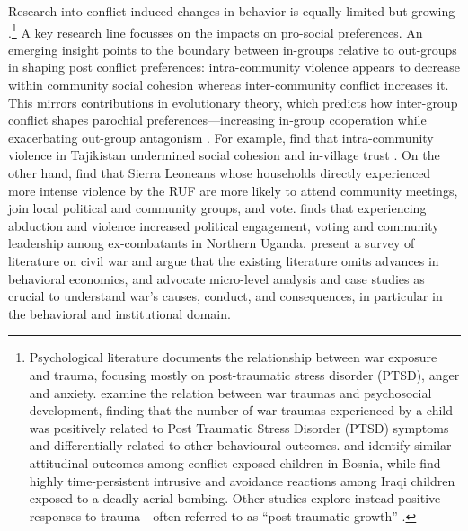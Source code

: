 Research into conflict induced changes in behavior is equally limited but growing \citep{Blattman2010b}.\footnote{Psychological literature documents the relationship between war exposure and trauma, focusing mostly on post-traumatic stress disorder (PTSD), anger and anxiety. \citet{Macksoud1996a} examine the relation between war traumas and psychosocial development, finding that the number of war traumas experienced by a child was positively related to Post Traumatic Stress Disorder (PTSD) symptoms and differentially related to other behavioural outcomes. \citet{Smith2002} and \citet{Layne2010} identify similar attitudinal outcomes among conflict exposed children in Bosnia, while \citet{Dyregrov2002} find highly time-persistent intrusive and avoidance reactions among Iraqi children exposed to a deadly aerial bombing. Other studies explore instead positive responses to trauma––often referred to as ``post-traumatic growth'' \citep{Tedeschi1996,Powell2003,Staub2008,Vollhardt2009}.} A key research line focusses on the impacts on pro-social preferences. An emerging insight points to the boundary between in-groups relative to out-groups in shaping post conflict preferences: intra-community violence appears to decrease within community social cohesion whereas inter-community conflict increases it. This mirrors contributions in evolutionary theory, which predicts how inter-group conflict shapes parochial preferences—increasing in-group cooperation while exacerbating out-group antagonism \citep{Bowles2006b,Bernhard2006b,Choi2007a}. For example, \cite{CassarAlessandra} find that intra-community violence in Tajikistan undermined social cohesion and in-village trust \citep[see also][]{Rohner2013}. On the other hand, \cite{Bellows2009b} find that Sierra Leoneans whose households directly experienced more intense violence by the RUF are more likely to attend community meetings, join local political and community groups, and vote. \cite{Blattman2009a} finds that experiencing abduction and violence increased political engagement, voting and community leadership among ex-combatants in Northern Uganda. \cite{Blattman2010b} present a survey of literature on civil war and argue that the existing literature omits advances in behavioral economics, and advocate micro-level analysis and case studies as crucial to understand war’s causes, conduct, and consequences, in particular in the behavioral and institutional domain.  

